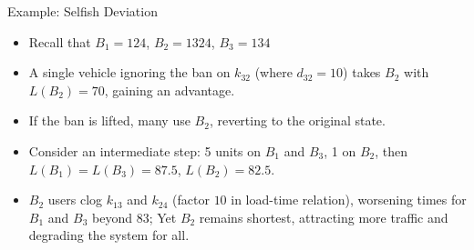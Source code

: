 \documentclass[10pt]{beamer}
\begin{document}
\begin{frame}{\cite{braess05} Example: Selfish Deviation}

  \begin{center}
  \end{center}
  \onslide<+->
  \begin{itemize}[<+->]
    \item Recall that $B_1 = 124$, $B_2 = 1324$, $B_3 = 134$
    \item A single vehicle ignoring the ban on $k_{32}$ (where $d_{32} = 10$) takes $B_2$ with $L(B_2) = 70$, gaining an advantage.
    \item If the ban is lifted, many use $B_2$, reverting to the original state. 
    \item Consider an intermediate step: 5 units on $B_1$ and $B_3$, 1 on $B_2$, then $L(B_1) = L(B_3) = 87.5$, $L(B_2) = 82.5$.
    \item $B_2$ users clog $k_{13}$ and $k_{24}$ (factor $10$ in load-time relation), worsening times for $B_1$ and $B_3$ beyond $83$; Yet $B_2$ remains shortest, attracting more traffic and degrading the system for all.
  \end{itemize}
\end{frame}
\end{document}
